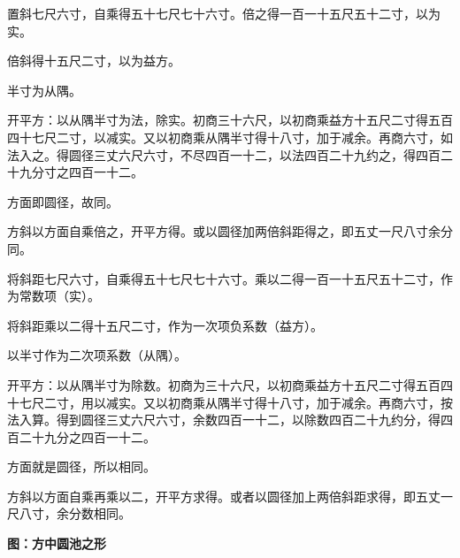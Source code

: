 \documentclass[11pt,a4paper]{article}
\newcommand{\origlabel}[1]{{\color{origcolor}\textbf{#1}}}
\newcommand{\modlabel}[1]{{\color{modcolor}\textbf{#1}}}
\newcommand{\origtext}[1]{{\color{origcolor}#1}}
\newcommand{\modtext}[1]{{\color{modcolor}#1}}
\begin{document}
\vspace{0.5em}
\noindent\origlabel{〔草曰〕}
\origtext{置斜七尺六寸，自乘得五十七尺七十六寸。倍之得一百一十五尺五十二寸，以为实。

倍斜得十五尺二寸，以为益方。

半寸为从隅。

开平方：以从隅半寸为法，除实。初商三十六尺，以初商乘益方十五尺二寸得五百四十七尺二寸，以减实。又以初商乘从隅半寸得十八寸，加于减余。再商六寸，如法入之。得圆径三丈六尺六寸，不尽四百一十二，以法四百二十九约之，得四百二十九分寸之四百一十二。

方面即圆径，故同。

方斜以方面自乘倍之，开平方得。或以圆径加两倍斜距得之，即五丈一尺八寸余分同。}

\vspace{0.5em}
\noindent\modlabel{〔白话文 · 草〕}
\modtext{将斜距七尺六寸，自乘得五十七尺七十六寸。乘以二得一百一十五尺五十二寸，作为常数项（实）。

将斜距乘以二得十五尺二寸，作为一次项负系数（益方）。

以半寸作为二次项系数（从隅）。

开平方：以从隅半寸为除数。初商为三十六尺，以初商乘益方十五尺二寸得五百四十七尺二寸，用以减实。又以初商乘从隅半寸得十八寸，加于减余。再商六寸，按法入算。得到圆径三丈六尺六寸，余数四百一十二，以除数四百二十九约分，得四百二十九分之四百一十二。

方面就是圆径，所以相同。

方斜以方面自乘再乘以二，开平方求得。或者以圆径加上两倍斜距求得，即五丈一尺八寸，余分数相同。}

\vspace{0.8em}
\noindent\textbf{图：方中圆池之形}
\begin{center}
\end{center}
\end{document}
